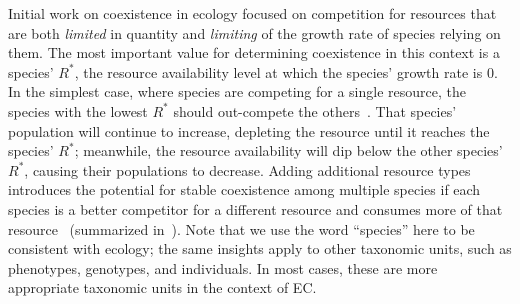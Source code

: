 Initial work on coexistence in ecology focused on competition for resources that are both \textit{limited} in quantity and \textit{limiting}
of the growth rate of species relying on them. The most important value for determining coexistence in this context is a species' $R^{*}$, the resource availability level at which the species' growth rate is 0. In the simplest case, where species are competing for a single resource, the species with the lowest $R^*$ 
should out-compete the others~\cite{grover_resource_1997}. That species' population will continue to increase, depleting the resource until it reaches the species' $R^*$; meanwhile, the resource availability will dip below the other species' $R^*$, causing their populations to decrease. Adding additional resource types introduces the potential for stable coexistence among multiple species if each species is a better competitor for a different resource and consumes more of that resource~\cite{chase_ecological_2003} (summarized in~\cite{letten_linking_2017}). Note that we use the word ``species'' here to be consistent with ecology; the same insights apply to other taxonomic units, such as phenotypes, genotypes, and individuals. In most cases, these are more appropriate taxonomic units in the context of EC.

